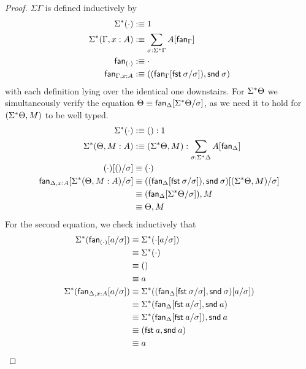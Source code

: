 \documentclass[10pt]{article}
\theoremstyle{definition}
\newcommand\dsd[1]{\ensuremath{\mathsf{#1}}}
\newcommand{\app}[2]{\ensuremath{#1 \: #2}}
\newcommand{\mt}[0]{\ensuremath{()}}
\newcommand{\fst}[1]{\app{\dsd{fst}}{#1}}
\newcommand{\snd}[1]{\app{\dsd{snd}}{#1}}
\newcommand\fan[1]{\ensuremath{\mathsf{fan}_{#1}}}
\begin{document}
\begin{proof}
$\Sigma \Gamma$ is defined inductively by
\begin{align*}
\ctxtuple{(\cdot)} &:\equiv 1 \\
\ctxtuple{(\Gamma, x : A)} &:\equiv \sum_{\sigma : \ctxtuple \Gamma} A[\fan{\Gamma}] \\
\fan{(\cdot)} &:\equiv \cdot \\
\fan{\Gamma, x : A} &:\equiv ((\fan\Gamma[\fst{\sigma}/\sigma]), \snd{\sigma})
\end{align*}
with each definition lying over the identical one downstairs. For $\Sigma^*{\Theta}$ we simultaneously verify the equation $\Theta \equiv \fan{\Delta}[\ctxtuple \Theta / \sigma]$, as we need it to hold for $(\Sigma^*{\Theta}, M)$ to be well typed.
\begin{align*}
\ctxtuple(\cdot) &:\equiv \mt : 1\\
\ctxtuple(\Theta, M : A) &:\equiv (\ctxtuple \Theta, M) : \sum_{\sigma : \ctxtuple \Delta} A[\fan{\Delta}] \\
(\cdot)[()/\sigma]  &\equiv (\cdot) \\
\fan{\Delta, x : A}[\ctxtuple{(\Theta, M : A)}/\sigma] &\equiv ((\fan{\Delta}[\fst{\sigma}/\sigma]), \snd{\sigma})[(\ctxtuple \Theta, M)/\sigma] \\
&\equiv (\fan{\Delta}[\ctxtuple \Theta/\sigma]), M \\
&\equiv \Theta, M
\end{align*}
For the second equation, we check inductively that
\begin{align*}
\ctxtuple{(\fan{(\cdot)}[a/\sigma])}
&\equiv \ctxtuple{(\cdot[a/\sigma])} \\
&\equiv \ctxtuple{(\cdot)} \\
&\equiv () \\
&\equiv a \\
\ctxtuple{(\fan{\Delta, x : A}[a/\sigma])}
&\equiv \ctxtuple{((\fan{\Delta}[\fst \sigma/\sigma], \snd \sigma)[a/\sigma])} \\
&\equiv \ctxtuple{(\fan{\Delta}[\fst a/\sigma], \snd a)} \\
&\equiv \ctxtuple{(\fan{\Delta}[\fst a/\sigma]), \snd a} \\
&\equiv (\fst a, \snd a) \\
&\equiv a
\end{align*}
\end{proof}
\end{document}
